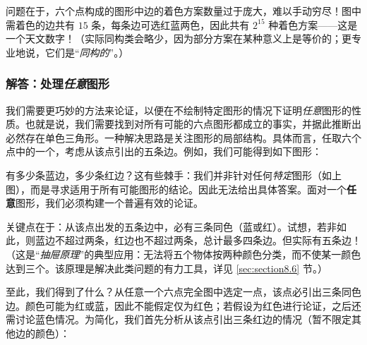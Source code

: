 问题在于，六个点构成的图形中边的着色方案数量过于庞大，难以手动穷尽！图中需着色的边共有 $15$ 条，每条边可选红蓝两色，因此共有 $2^{15}$ 种着色方案——这是一个天文数字！（实际同构类会略少，因为部分方案在某种意义上是等价的；更专业地说，它们是``\emph{同构的}''。）

\subsubsection*{解答：处理\emph{任意}图形}

我们需要更巧妙的方法来论证，以便在不绘制特定图形的情况下证明\emph{任意}图形的性质。也就是说，我们需要找到对所有可能的六点图形都成立的事实，并据此推断出必然存在单色三角形。一种解决思路是关注图形的局部结构。具体而言，任取六个点中的一个，考虑从该点引出的五条边。例如，我们可能得到如下图形：

\begin{center}
\end{center}

有多少条蓝边，多少条红边？这有些棘手：我们并非针对任何\emph{特定}图形（如上图），而是寻求适用于所有可能图形的结论。因此无法给出具体答案。面对一个\textbf{任意}图形，我们必须构建一个普遍有效的论证。

关键点在于：从该点出发的五条边中，必有三条同色（蓝或红）。试想，若非如此，则蓝边不超过两条，红边也不超过两条，总计最多四条边。但实际有五条边！（这是``\emph{抽屉原理}''的典型应用：无法将五个物体按两种颜色分类，而不使某一颜色达到三个。该原理是解决此类问题的有力工具，详见 \ref{sec:section8.6} 节。）

至此，我们得到了什么？从任意一个六点完全图中选定一点，该点必引出三条同色边。颜色可能为红或蓝，因此不能假定仅为红色；若假设为红色进行论证，之后还需讨论蓝色情况。为简化，我们首先分析从该点引出三条红边的情况（暂不限定其他边的颜色）：

\begin{center}
\end{center}

